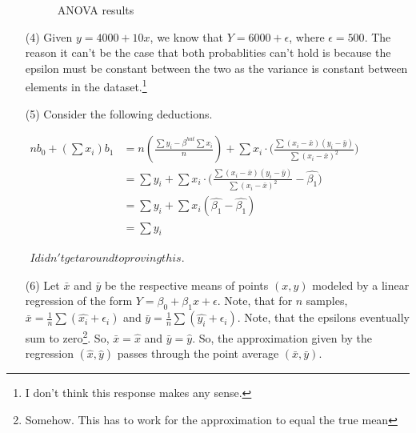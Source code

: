 \documentclass[12pt]{article}
\begin{document}
\begin{enumerate}
\begin{figure}[!h]
			\caption{ANOVA results}
		\end{figure}
	\item[(4)] Given $y = 4000 + 10x$, we know that $Y = 6000 + \epsilon$, where $\epsilon = 500$. The reason it can't be the case that both probablities can't hold is because 
	the epsilon must be constant between the two as the variance is constant between 
	elements in the dataset.\footnote{I don't think this response makes any sense.}
	\item[(5)]  Consider the following deductions.
		\begin{center}
			\begin{math}
				\begin{aligned}
					nb_0 + (\sum x_i)b_1 &= n(\frac{\sum y_i - \beta^{hat}\sum x_i}{n}) + \sum x_i \cdot \bigg(\frac{\sum (x_i - \bar{x})(y_i - \bar{y})}{\sum(x_i - \bar{x})^2} \bigg)\\
					&= \sum y_i + \sum x_i \cdot \bigg(\frac{\sum (x_i - \bar{x})(y_i - \bar{y})}{\sum(x_i - \bar{x})^2} - \hat{\beta_1} \bigg)\\
					&= \sum y_i + \sum x_i (\hat{\beta_1} - \hat{\beta_1})\\
					&= \sum y_i
				\end{aligned}
			\end{math}
		\end{center}

		\begin{center}
			\begin{math}
				\begin{aligned}
					I didn't get around to proving this.
				\end{aligned}
			\end{math}
		\end{center}
	\item[(6)] Let $\bar{x}$ and $\bar{y}$ be the respective means of points $(x,y)$ modeled by a linear regression of the form $Y = \beta_0 + \beta_1 x + \epsilon$. Note, that 
		for $n$ samples, $\bar{x} = \frac{1}{n}\sum (\hat{x_i} + \epsilon_i)$ 
and $\bar{y} = \frac{1}{n}\sum (\hat{y_i} + \epsilon_i)$. Note, that the epsilons 
		eventually sum to zero\footnote{Somehow. This has to work for the approximation to equal the true mean}. So, $\bar{x} = \hat{x}$ and $\bar{y} = \hat{y}$. So, 
		the approximation given by the regression $(\hat{x}, \hat{y})$ passes 
		through the point average $(\bar{x}, \bar{y})$.
\end{enumerate}
\end{document}

